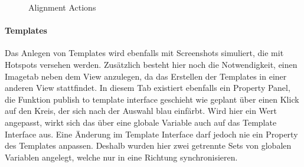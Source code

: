 \begin{figure}%
\centering
{}%
\qquad
{}%

\caption{Alignment Actions}%
\label{fig:Prototyp_06}
\end{figure}

\paragraph{Templates}
Das Anlegen von Templates wird ebenfalls mit Screenshots simuliert, die mit Hotspots versehen werden.
Zusätzlich besteht hier noch die Notwendigkeit, einen Imagetab neben dem View anzulegen, da das Erstellen der Templates in einer anderen View stattfindet.
In diesem Tab existiert ebenfalls ein Property Panel, die Funktion \glqq publish to template interface\grqq{} geschieht wie geplant über einen Klick auf den Kreis, der sich nach der Auswahl blau einfärbt.
Wird hier ein Wert angepasst, wirkt sich das über eine globale Variable auch auf das Template Interface aus.
Eine Änderung im Template Interface darf jedoch nie ein Property des Templates anpassen.
Deshalb wurden hier zwei getrennte Sets von globalen Variablen angelegt, welche nur in eine Richtung synchronisieren.

